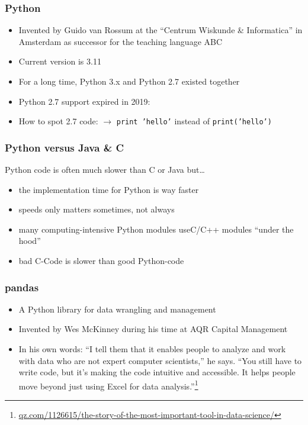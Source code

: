 \documentclass[ngerman]{beamer}
\begin{document}
\begin{frame}
\frametitle{Python}

\begin{itemize}
	\item Invented by Guido van Rossum at the \enquote{Centrum Wiskunde \& Informatica} in Amsterdam as successor for the teaching language ABC
	\item Current version is 3.11
	\item For a long time, Python 3.x and Python 2.7 existed together
	\item Python 2.7 support expired in 2019:
	\item How to spot 2.7 code: $\rightarrow$ \texttt{print 'hello'} instead of \texttt{print('hello')}
\end{itemize}

\end{frame}

\begin{frame}
\frametitle{Python versus Java \& C}

Python code is often much slower than C or Java but\ldots

\begin{itemize}
\item the implementation time for Python is way faster
\item speeds only matters sometimes, not always
\item many computing-intensive Python modules use\newline C/C++ modules \enquote{under the hood}
\item bad C-Code is slower than good Python-code
\end{itemize}
\end{frame}


\begin{frame}
\frametitle{pandas}

\begin{itemize}
	\item A Python library for data wrangling and management
	\item Invented by Wes McKinney during his time at AQR Capital Management
	\item In his own words:
\enquote{I tell them that it enables people to analyze and work with data who are not expert computer scientists,} he says. \enquote{You still have to write code, but it’s making the code intuitive and accessible. It helps people move beyond just using Excel for data analysis.}\footnote{\url{qz.com/1126615/the-story-of-the-most-important-tool-in-data-science/}}
\end{itemize}

\end{frame}
\end{document}
